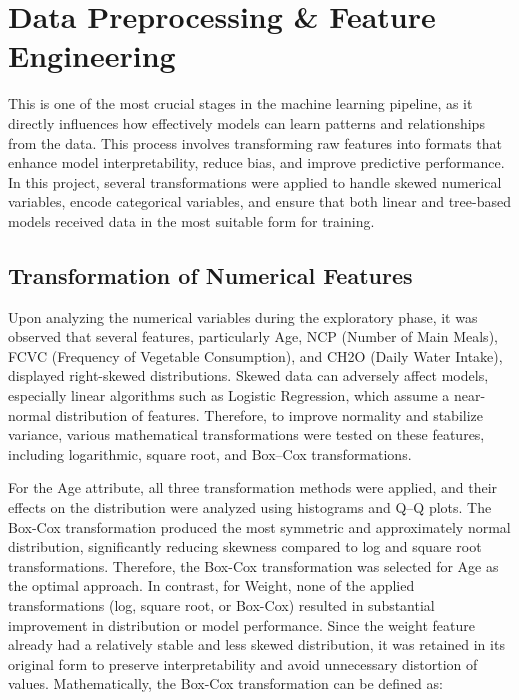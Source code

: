 \chapter{Data Preprocessing \& Feature Engineering}\label{ch:feature-engineering}


This is one of the most crucial stages in the machine learning pipeline, as it directly influences how effectively models can learn patterns and relationships from the data.
This process involves transforming raw features into formats that enhance model interpretability, reduce bias, and improve predictive performance.
In this project, several transformations were applied to handle skewed numerical variables, encode categorical variables, and ensure that both linear and tree-based models received data in the most suitable form for training.



\section{Transformation of Numerical Features}\label{sec:transformation-of-numerical-features}

Upon analyzing the numerical variables during the exploratory phase, it was observed that several features, particularly Age, NCP (Number of Main Meals), FCVC (Frequency of Vegetable Consumption), and CH2O (Daily Water Intake), displayed right-skewed distributions.
Skewed data can adversely affect models, especially linear algorithms such as Logistic Regression, which assume a near-normal distribution of features.
Therefore, to improve normality and stabilize variance, various mathematical transformations were tested on these features, including logarithmic, square root, and Box–Cox transformations.

For the Age attribute, all three transformation methods were applied, and their effects on the distribution were analyzed using histograms and Q–Q plots.
The Box-Cox transformation produced the most symmetric and approximately normal distribution, significantly reducing skewness compared to log and square root transformations.
Therefore, the Box-Cox transformation was selected for Age as the optimal approach.
In contrast, for Weight, none of the applied transformations (log, square root, or Box-Cox) resulted in substantial improvement in distribution or model performance.
Since the weight feature already had a relatively stable and less skewed distribution, it was retained in its original form to preserve interpretability and avoid unnecessary distortion of values.
Mathematically, the Box-Cox transformation can be defined as:

